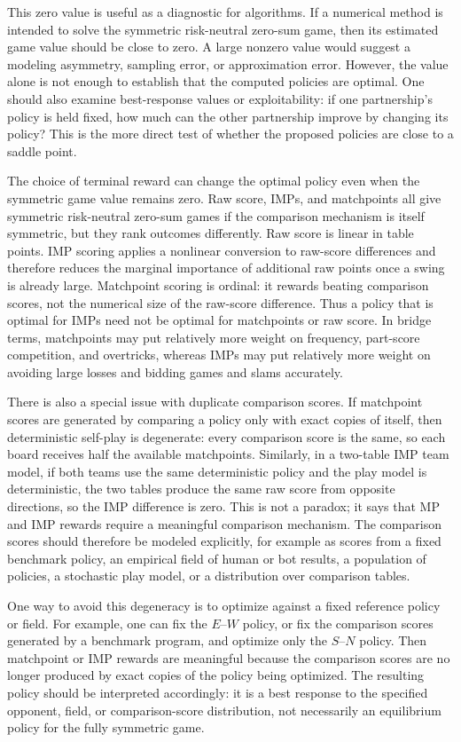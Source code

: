 \documentclass[11pt]{article}
\begin{document}
This zero value is useful as a diagnostic for algorithms. If a numerical method is intended to solve the symmetric risk-neutral zero-sum game, then its estimated game value should be close to zero. A large nonzero value would suggest a modeling asymmetry, sampling error, or approximation error. However, the value alone is not enough to establish that the computed policies are optimal. One should also examine best-response values or exploitability: if one partnership's policy is held fixed, how much can the other partnership improve by changing its policy? This is the more direct test of whether the proposed policies are close to a saddle point.

The choice of terminal reward can change the optimal policy even when the symmetric game value remains zero. Raw score, IMPs, and matchpoints all give symmetric risk-neutral zero-sum games if the comparison mechanism is itself symmetric, but they rank outcomes differently. Raw score is linear in table points. IMP scoring applies a nonlinear conversion to raw-score differences and therefore reduces the marginal importance of additional raw points once a swing is already large. Matchpoint scoring is ordinal: it rewards beating comparison scores, not the numerical size of the raw-score difference. Thus a policy that is optimal for IMPs need not be optimal for matchpoints or raw score. In bridge terms, matchpoints may put relatively more weight on frequency, part-score competition, and overtricks, whereas IMPs may put relatively more weight on avoiding large losses and bidding games and slams accurately.

There is also a special issue with duplicate comparison scores. If matchpoint scores are generated by comparing a policy only with exact copies of itself, then deterministic self-play is degenerate: every comparison score is the same, so each board receives half the available matchpoints. Similarly, in a two-table IMP team model, if both teams use the same deterministic policy and the play model is deterministic, the two tables produce the same raw score from opposite directions, so the IMP difference is zero. This is not a paradox; it says that MP and IMP rewards require a meaningful comparison mechanism. The comparison scores should therefore be modeled explicitly, for example as scores from a fixed benchmark policy, an empirical field of human or bot results, a population of policies, a stochastic play model, or a distribution over comparison tables.

One way to avoid this degeneracy is to optimize against a fixed reference policy or field. For example, one can fix the $E$--$W$ policy, or fix the comparison scores generated by a benchmark program, and optimize only the $S$--$N$ policy. Then matchpoint or IMP rewards are meaningful because the comparison scores are no longer produced by exact copies of the policy being optimized. The resulting policy should be interpreted accordingly: it is a best response to the specified opponent, field, or comparison-score distribution, not necessarily an equilibrium policy for the fully symmetric game.
\end{document}
